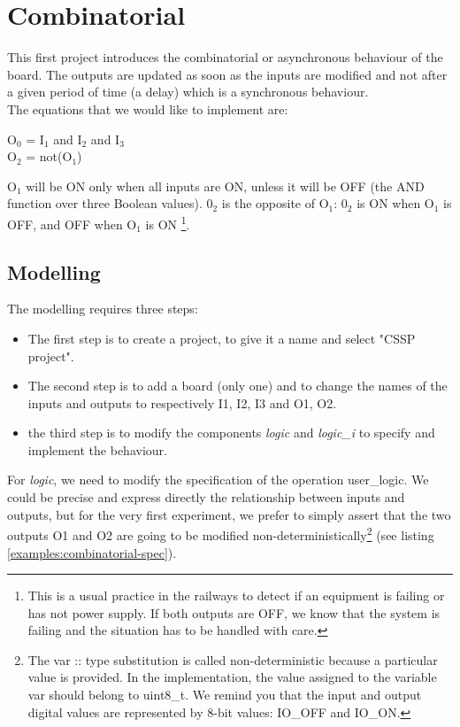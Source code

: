 \chapter{Combinatorial}

This first project introduces the combinatorial or asynchronous behaviour of the board. The outputs are updated as soon as the inputs are modified and not after a given period of time (a delay) which is a synchronous behaviour.\\
The equations that we would like to implement are:
\begin{center}
O$_0$ = I$_1$ and I$_2$ and I$_3$\\
O$_2$ = not(O$_1$)    
\end{center}
O$_1$ will be ON only when all inputs are ON, unless it will be OFF (the AND function over three Boolean values). 0$_2$ is the opposite of O$_1$: 0$_2$ is ON when O$_1$ is OFF, and OFF when O$_1$ is ON \footnote{This is a usual practice in the railways to detect if an equipment is failing or has not power supply. If both outputs are OFF, we know that the system is failing and the situation has to be handled with care.}.

\section{Modelling}

The modelling requires three steps:
\begin{itemize}
    \item The first step is to create a project, to give it a name and select "CSSP project".
    \item The second step is to add a board (only one) and to change the names of the inputs and outputs to respectively I1, I2, I3 and O1, O2.
    \item the third step is to modify the components \textit{logic} and \textit{logic\_i} to specify and implement the behaviour. 
\end{itemize}
 


For \textit{logic}, we need to modify the specification of the operation user\_logic. We could be precise and express directly the relationship between inputs and outputs, but for the very first experiment, we prefer to simply assert that the two outputs O1 and O2 are going to be modified non-deterministically\footnote{The var :: type substitution is called non-deterministic because a particular value is provided. In the implementation, the value assigned to the variable var should belong to uint8\_t. We remind you that the input and output digital values are represented by 8-bit values: IO\_OFF and IO\_ON.} (see listing \ref{examples:combinatorial-spec}). 

